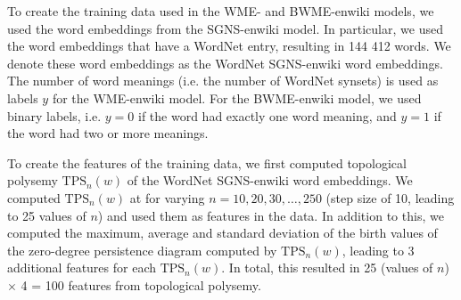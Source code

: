 To create the training data used in the WME- and BWME-enwiki models, we used the word embeddings from the SGNS-enwiki model. In particular, we used the word embeddings that have a WordNet entry, resulting in 144 412 words. We denote these word embeddings as the WordNet SGNS-enwiki word embeddings. The number of word meanings (i.e. the number of WordNet synsets) is used as labels $y$ for the WME-enwiki model. For the BWME-enwiki model, we used binary labels, i.e. $y=0$ if the word had exactly one word meaning, and $y=1$ if the word had two or more meanings.

To create the features of the training data, we first computed topological polysemy $\text{TPS}_n(w)$ of the WordNet SGNS-enwiki word embeddings. We computed $\text{TPS}_n(w)$ at for varying $n=10, 20, 30, \ldots, 250$ (step size of 10, leading to 25 values of $n$) and used them as features in the data. In addition to this, we computed the maximum, average and standard deviation of the birth values of the zero-degree persistence diagram computed by $\text{TPS}_n(w)$, leading to 3 additional features for each $\text{TPS}_n(w)$. In total, this resulted in 25 (values of $n$) $\times$ 4 = 100 features from topological polysemy.


